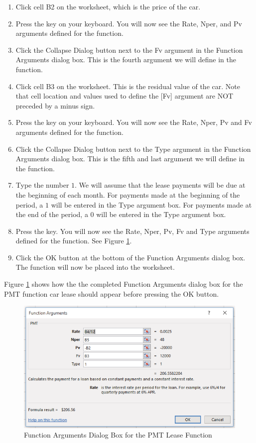 \begin{enumerate}
	\item Click cell \textsf{B2} on the worksheet, which is the price of the car.
	\item Press the  key on your keyboard. You will now see the Rate, Nper, and Pv arguments defined for the function.
	\item Click the Collapse Dialog button next to the Fv argument in the Function Arguments dialog box. This is the fourth argument we will define in the function.
	\item Click cell \textsf{B3} on the worksheet. This is the residual value of the car. Note that cell location and values used to define the [Fv] argument are NOT preceded by a minus sign.
	\item Press the  key on your keyboard. You will now see the Rate, Nper, Pv and Fv arguments defined for the function.
	\item Click the Collapse Dialog button next to the Type argument in the Function Arguments dialog box. This is the fifth and last argument we will define in the function.
	\item Type the number $ 1 $. We will assume that the lease payments will be due at the beginning of each month. For payments made at the beginning of the period, a $ 1 $ will be entered in the Type argument box. For payments made at the end of the period, a $ 0 $ will be entered in the Type argument box.
	\item Press the  key. You will now see the Rate, Nper, Pv, Fv and Type arguments defined for the function. See Figure \ref{02:fig34}.
	\item Click the OK button at the bottom of the Function Arguments dialog box. The function will now be placed into the worksheet.
\end{enumerate}

Figure \ref{02:fig34} shows how the the completed Function Arguments dialog box for the PMT function car lease should appear before pressing the OK button.

\begin{figure}[H]
	\centering
	\includegraphics[width=\maxwidth{.95\linewidth}]{gfx/ch02_fig34}
	\caption{Function Arguments Dialog Box for the PMT Lease Function}
	\label{02:fig34}
\end{figure}

